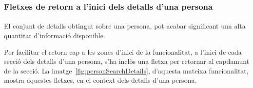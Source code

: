 \subsubsection{Fletxes de retorn a l'inici dels detalls d'una persona}

\paragraph{}
El conjunt de detalls obtingut sobre una persona, pot acabar significant una alta quantitat d'informació disponible.

Per facilitar el retorn cap a les zones d'inici de la funcionalitat, a l’inici de cada secció dels detalls d'una persona, s'ha inclòs una fletxa per retornar al capdamunt de la secció. La imatge~\ref{fig:personSearchDetails}, d'aquesta mateixa funcionalitat, mostra aquestes fletxes, en el context dels detalls d’una persona.
